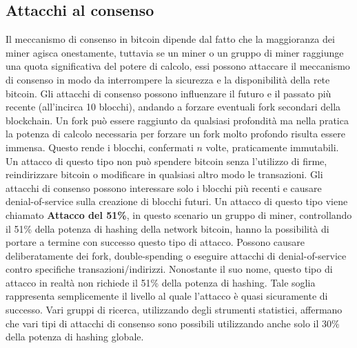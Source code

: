 \subsection{Attacchi al consenso}
Il meccanismo di consenso in bitcoin dipende dal fatto che la maggioranza dei miner agisca onestamente, tuttavia se un miner o un gruppo di miner raggiunge una quota significativa del potere di calcolo, essi possono attaccare il meccanismo di consenso in modo da interrompere la sicurezza e la disponibilità della rete bitcoin. Gli attacchi di consenso possono influenzare il futuro e il passato più recente (all'incirca 10 blocchi), andando a forzare eventuali fork secondari della blockchain. Un fork può essere raggiunto da qualsiasi profondità ma nella pratica la potenza di calcolo necessaria per forzare un fork molto profondo risulta essere immensa. Questo rende i blocchi, confermati $n$ volte, praticamente immutabili. Un attacco di questo tipo non può spendere bitcoin senza l'utilizzo di firme, reindirizzare bitcoin o modificare in qualsiasi altro modo le transazioni. Gli attacchi di consenso possono interessare solo i blocchi più recenti e causare denial-of-service sulla creazione di blocchi futuri. Un attacco di questo tipo viene chiamato \textbf{Attacco del 51\%}, in questo scenario un gruppo di miner, controllando il 51\% della potenza di hashing della network bitcoin, hanno la possibilità di portare a termine con successo questo tipo di attacco. Possono causare deliberatamente dei fork, double-spending o eseguire attacchi di denial-of-service contro specifiche transazioni/indirizzi. Nonostante il suo nome, questo tipo di attacco in realtà non richiede il 51\% della potenza di hashing. Tale soglia rappresenta semplicemente il livello al quale l'attacco è quasi sicuramente di successo. Vari gruppi di ricerca, utilizzando degli strumenti statistici, affermano che vari tipi di attacchi di consenso sono possibili utilizzando anche solo il 30\% della potenza di hashing globale.

